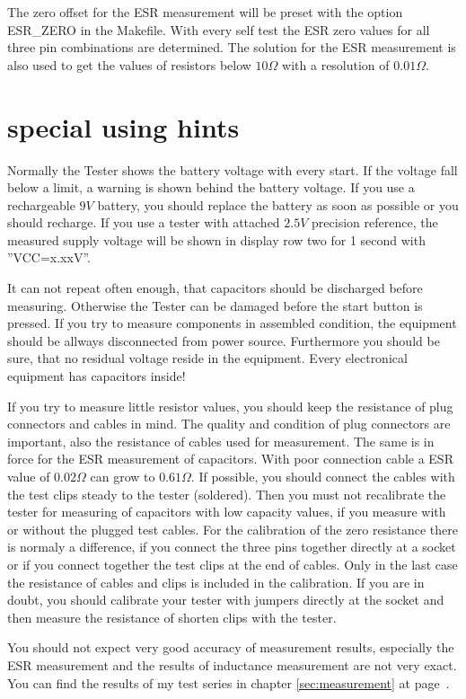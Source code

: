 The zero offset for the ESR measurement will be preset with the option ESR\_ZERO in the Makefile.
With every self test the ESR zero values for all three pin combinations are determined.
The solution for the ESR measurement is also used to get the values of resistors below \(10\Omega\) with
a resolution of \(0.01\Omega\).


\section{special using hints}
Normally the Tester shows the battery voltage with every start. If the voltage fall below a limit,
a warning is shown behind the battery voltage. If you use a rechargeable \(9V\) battery, you should replace
the battery as soon as possible or you should recharge.
If you use a tester with attached \(2.5V\) precision reference, the measured supply voltage will be shown
in display row two for 1 second with ''VCC=x.xxV''.

It can not repeat often enough, that capacitors should be discharged before measuring.
Otherwise the Tester can be damaged before the start button is pressed.
If you try to measure components in assembled condition, the equipment should be allways disconnected from power source.
Furthermore you should be sure, that no residual voltage reside in the equipment.
Every electronical equipment has capacitors inside!

If you try to measure little resistor values, you should keep the resistance of plug connectors and cables in mind.
The quality and condition of plug connectors are important, also the resistance of cables used for measurement.
The same is in force for the ESR measurement of capacitors.
With poor connection cable a ESR value of \(0.02\Omega\) can grow to \(0.61\Omega\).
If possible, you should connect the cables with the test clips steady to the tester (soldered).
Then you must not recalibrate the tester for measuring of capacitors with low capacity values,
if you measure with or without the plugged test cables. 
For the calibration of the zero resistance there is normaly a difference, if you connect the
three pins together directly at a socket or if you connect together the test clips at the end of cables.
Only in the last case the resistance of cables and clips is included in the calibration.
If you are in doubt, you should calibrate your tester with jumpers directly at the socket 
and then measure the resistance of shorten clips with the tester.

You should not expect very good accuracy of measurement results, especially the ESR measurement and the results of inductance measurement are not very exact.
You can find the results of my test series in chapter \ref{sec:measurement} at page~\pageref{sec:measurement}.

